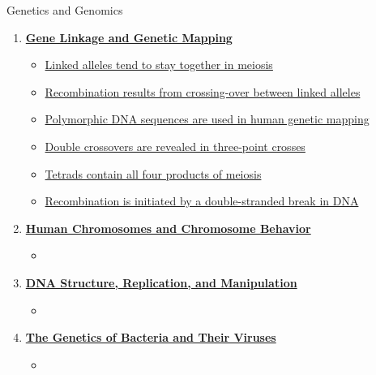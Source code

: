 \documentclass[12pt,letterpaper]{article}
\begin{document}
\begin{chapbox}{Genetics and Genomics}
{\begin{enumerate}[font=\bfseries, wide]
\begin{itemize}
        \item \hyperlink{3.2}{The daughter cells of mitosis have identical chromosomes}
        \item \hyperlink{3.3}{Meiosis results in gametes that differ genetically}
        \item \hyperlink{3.4}{Eukaryotic chromosomes are highly coiled complexes of DNA and protein}
        \item \hyperlink{3.5}{The centromere and telomere are essential parts of chromosomes}
        \item \hyperlink{3.6}{Genes are located in chromosomes}
        \item \hyperlink{3.7}{Genetic data analysis makes use of probability and statistics}
    \end{itemize}
    \item \hyperlink{4}{\textbf{Gene Linkage and Genetic Mapping}}
    \begin{itemize}
        \item \hyperlink{4.1}{Linked alleles tend to stay together in meiosis}
        \item \hyperlink{4.2}{Recombination results from crossing-over between linked alleles}
        \item \hyperlink{4.3}{Polymorphic DNA sequences are used in human genetic mapping}
        \item \hyperlink{4.4}{Double crossovers are revealed in three-point crosses}
        \item \hyperlink{4.5}{Tetrads contain all four products of meiosis}
        \item \hyperlink{4.6}{Recombination is initiated by a double-stranded break in DNA}
    \end{itemize}
    \item \hyperlink{5}{\textbf{Human Chromosomes and Chromosome Behavior}}
    \begin{itemize}
        \item 
    \end{itemize}
    \item \hyperlink{6}{\textbf{DNA Structure, Replication, and Manipulation}}
    \begin{itemize}
        \item 
    \end{itemize}
    \item \hyperlink{7}{\textbf{The Genetics of Bacteria and Their Viruses}}
    \begin{itemize}
        \item 

\end{itemize}
\end{enumerate}}
\end{chapbox}
\end{document}

